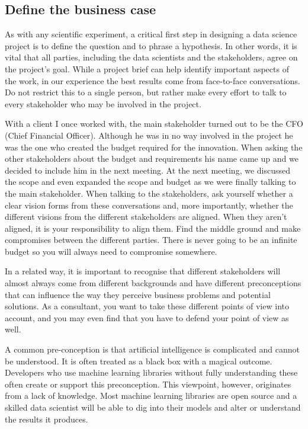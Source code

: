 \documentclass[
]{book}
\begin{document}
\hypertarget{define-the-business-case}{%
\subsection{Define the business case}\label{define-the-business-case}}

As with any scientific experiment, a critical first step in designing a
data science project is to define the question and to phrase a
hypothesis. In other words, it is vital that all parties, including the
data scientists and the stakeholders, agree on the project's goal. While
a project brief can help identify important aspects of the work, in our
experience the best results come from face-to-face conversations. Do not
restrict this to a single person, but rather make every effort to talk
to every stakeholder who may be involved in the project.

With a client I once worked with, the main stakeholder turned out to be
the CFO (Chief Financial Officer). Although he was in no way involved in
the project he was the one who created the budget required for the
innovation. When asking the other stakeholders about the budget and
requirements his name came up and we decided to include him in the next
meeting. At the next meeting, we discussed the scope and even expanded
the scope and budget as we were finally talking to the main stakeholder.
When talking to the stakeholders, ask yourself whether a clear vision
forms from these conversations and, more importantly, whether the
different visions from the different stakeholders are aligned. When they
aren't aligned, it is your responsibility to align them. Find the middle
ground and make compromises between the different parties. There is
never going to be an infinite budget so you will always need to
compromise somewhere.

In a related way, it is important to recognise that different
stakeholders will almost always come from different backgrounds and have
different preconceptions that can influence the way they perceive
business problems and potential solutions. As a consultant, you want to
take these different points of view into account, and you may even find
that you have to defend your point of view as well.

A common pre-conception is that artificial intelligence is complicated
and cannot be understood. It is often treated as a black box with a
magical outcome. Developers who use machine learning libraries without
fully understanding these often create or support this preconception.
This viewpoint, however, originates from a lack of knowledge. Most
machine learning libraries are open source and a skilled data scientist
will be able to dig into their models and alter or understand the
results it produces.
\end{document}
